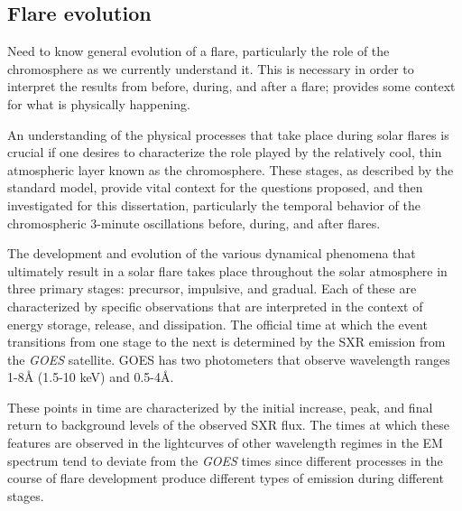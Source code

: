 \subsection{Flare evolution}

Need to know general evolution of a flare, particularly the role of the
chromosphere as we currently understand it.
This is necessary in order
to interpret the results from before, during, and after a flare;
provides some context for what is physically happening.

An understanding of the physical processes that take place
during solar flares
is crucial if one desires to characterize the role played by the
relatively cool, thin atmospheric layer known as the chromosphere.
These stages, as described by the standard model,
provide vital context for the questions proposed, and then
investigated for this dissertation,
particularly the temporal behavior
of the chromospheric 3-minute oscillations before, during, and after flares.

The development and evolution
of the various dynamical phenomena that ultimately
result in a solar flare
takes place throughout the solar atmosphere
in three primary stages:
precursor, impulsive, and gradual.
Each of these are characterized by specific observations that are interpreted
in the context of energy storage, release, and dissipation.
The official time at which the event transitions from one stage to the next
is determined by the SXR emission from the \textit{GOES} satellite.
GOES has two photometers that observe wavelength ranges
1-8\AA{} (1.5-10 keV) and 0.5-4\AA{}.


These points in time are
characterized by the initial increase, peak, and final return
to background levels of the observed SXR flux.
The times at which these features are observed in the
lightcurves of other wavelength regimes in the EM spectrum
tend to deviate from the \textit{GOES} times
since different processes in the course of flare development
produce different types of emission during different stages.

